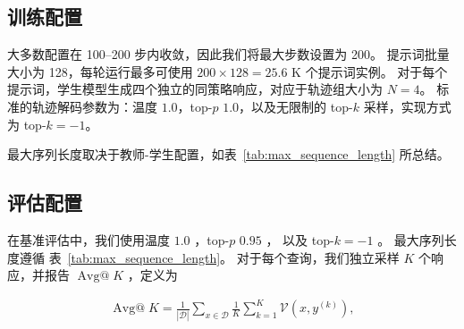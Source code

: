 \subsection{训练配置}
\label{sec:training_config}

大多数配置在 100--200 步内收敛，因此我们将最大步数设置为 200。  
提示词批量大小为 128，每轮运行最多可使用 $200\times128=25.6$ K 个提示词实例。  
对于每个提示词，学生模型生成四个独立的同策略响应，对应于轨迹组大小为 $N=4$。  
标准的轨迹解码参数为：温度 $1.0$，top-$p$  $1.0$，以及无限制的 top-$k$ 采样，实现方式为 top-$k=-1$。

最大序列长度取决于教师-学生配置，如表~\ref{tab:max_sequence_length} 所总结。

\begin{table}[t]
    \centering
    \caption{用于OPD推出和评估的最大序列长度。}
    \label{tab:max_sequence_length}
\end{table}



\subsection{评估配置}


在基准评估中，我们使用温度 $1.0$ ，top-$p$  $0.95$ ，
以及 top-$k=-1$ 。  
最大序列长度遵循
表~\ref{tab:max_sequence_length}。  
对于每个查询，我们独立采样 $K$ 个响应，并报告
$\operatorname{Avg@}K$ ，定义为

\begingroup
\begin{align*}
    \operatorname{Avg@}K
    =
    \frac{1}{|\mathcal{D}|}
    \sum_{x\in\mathcal{D}}
    \frac{1}{K}
    \sum_{k=1}^{K}
    \mathcal{V}\!\left(x,y^{(k)}\right),
    \label{eq:avg_at_k}
\end{align*}
\endgroup

